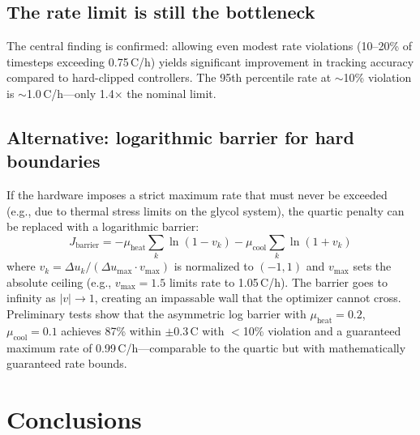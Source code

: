 \documentclass[11pt]{article}
\begin{document}
\subsection{The rate limit is still the bottleneck}

The central finding is confirmed: allowing even modest rate violations
(10--20\% of timesteps exceeding 0.75\,\textdegree C/h) yields
significant improvement in tracking accuracy compared to hard-clipped
controllers.  The 95th percentile rate at $\sim$10\% violation is
$\sim$1.0\,\textdegree C/h---only 1.4$\times$ the nominal limit.

\subsection{Alternative: logarithmic barrier for hard boundaries}

If the hardware imposes a strict maximum rate that must never be exceeded
(e.g., due to thermal stress limits on the glycol system), the quartic
penalty can be replaced with a logarithmic barrier:
\begin{equation}
  J_\mathrm{barrier} = -\mu_\mathrm{heat} \sum_k \ln(1 - v_k)
                       -\mu_\mathrm{cool} \sum_k \ln(1 + v_k)
\end{equation}
where $v_k = \Delta u_k / (\Delta u_\mathrm{max} \cdot v_\mathrm{max})$
is normalized to $(-1, 1)$ and $v_\mathrm{max}$ sets the absolute ceiling
(e.g., $v_\mathrm{max} = 1.5$ limits rate to 1.05\,\textdegree C/h).
The barrier goes to infinity as $|v| \to 1$, creating an impassable wall
that the optimizer cannot cross.  Preliminary tests show that the asymmetric
log barrier with $\mu_\mathrm{heat} = 0.2$, $\mu_\mathrm{cool} = 0.1$
achieves 87\% within $\pm$0.3\,\textdegree C with $<$10\% violation and a
guaranteed maximum rate of 0.99\,\textdegree C/h---comparable to the quartic
but with mathematically guaranteed rate bounds.

\section{Conclusions}
\end{document}

